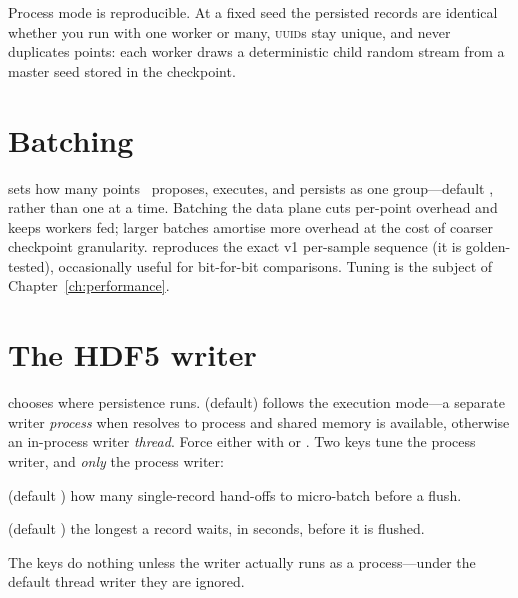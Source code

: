 \begin{jnote}
Process mode is reproducible. At a fixed seed the persisted records are identical whether you run
with one worker or many, \textsc{uuid}s stay unique, and  never duplicates points:
each worker draws a deterministic child random stream from a master seed stored in the checkpoint.
\end{jnote}

\section{Batching}
\label{sec:rt-batch}

 sets how many points \Jarvis\ proposes, executes, and persists as one
group---default , rather than one at a time. Batching the data plane cuts per-point
overhead and keeps workers fed; larger batches amortise more overhead at the cost of coarser
checkpoint granularity.  reproduces the exact v1 per-sample sequence (it is
golden-tested), occasionally useful for bit-for-bit comparisons. Tuning is the subject of
Chapter~\ref{ch:performance}.

\section{The HDF5 writer}
\label{sec:rt-writer}

 chooses where persistence runs.  (default) follows the execution
mode---a separate writer \emph{process} when  resolves to process and shared memory is
available, otherwise an in-process writer \emph{thread}. Force either with  or
. Two keys tune the process writer, and \emph{only} the process writer:

\begin{description}[style=nextline, leftmargin=1.2em]
  \item[\yamlkey{writer\_record\_batch\_size}] (default ) how many single-record hand-offs
        to micro-batch before a flush.
  \item[\yamlkey{writer\_record\_flush\_interval}] (default ) the longest a record waits,
        in seconds, before it is flushed.
\end{description}

\begin{jwarn}
The  keys do nothing unless the writer actually runs as a process---under
the default thread writer they are ignored.
\end{jwarn}

